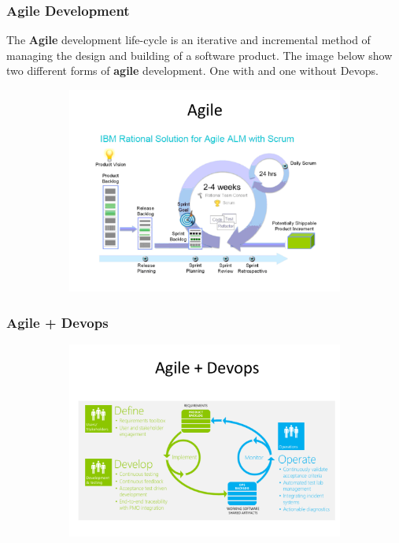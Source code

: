 \documentclass[a4paper]{article}
\begin{document}
\subsubsection{Agile Development}
The \textbf{Agile} development life-cycle is an iterative and incremental method of managing the design and building of a software product. The image below show two different forms of \textbf{agile} development. One with and one without Devops.
\begin{figure}[H]
\hskip-2.5cm\begin{subfigure}{1.2\textwidth}
  \includegraphics[width=1.2\linewidth]
  {images/3-Agile.png}
\end{subfigure}
\end{figure}
\subsubsection{Agile + Devops}
\begin{figure}[H]
\hskip-2.5cm\begin{subfigure}{1.2\textwidth}
  \includegraphics[width=1.2\linewidth]
  {images/3-ADevops.png}
\end{subfigure}
\end{figure}
\end{document}
